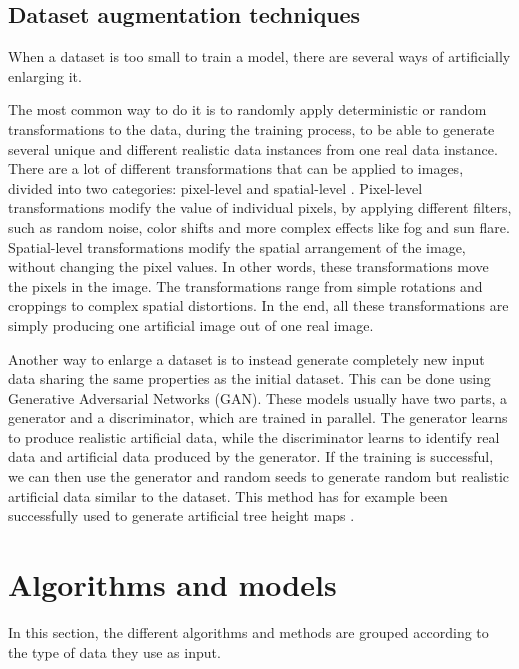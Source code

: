 \documentclass[
]{report}
\begin{document}
\subsection{Dataset augmentation
techniques}\label{dataset-augmentation-techniques}

When a dataset is too small to train a model, there are several ways of
artificially enlarging it.

The most common way to do it is to randomly apply deterministic or
random transformations to the data, during the training process, to be
able to generate several unique and different realistic data instances
from one real data instance. There are a lot of different
transformations that can be applied to images, divided into two
categories: pixel-level and spatial-level \autocite{albumentations}.
Pixel-level transformations modify the value of individual pixels, by
applying different filters, such as random noise, color shifts and more
complex effects like fog and sun flare. Spatial-level transformations
modify the spatial arrangement of the image, without changing the pixel
values. In other words, these transformations move the pixels in the
image. The transformations range from simple rotations and croppings to
complex spatial distortions. In the end, all these transformations are
simply producing one artificial image out of one real image.

Another way to enlarge a dataset is to instead generate completely new
input data sharing the same properties as the initial dataset. This can
be done using Generative Adversarial Networks (GAN). These models
usually have two parts, a generator and a discriminator, which are
trained in parallel. The generator learns to produce realistic
artificial data, while the discriminator learns to identify real data
and artificial data produced by the generator. If the training is
successful, we can then use the generator and random seeds to generate
random but realistic artificial data similar to the dataset. This method
has for example been successfully used to generate artificial tree
height maps \autocite{gan_data_augment}.

\section{Algorithms and models}\label{algorithms-and-models}

In this section, the different algorithms and methods are grouped
according to the type of data they use as input.
\end{document}
